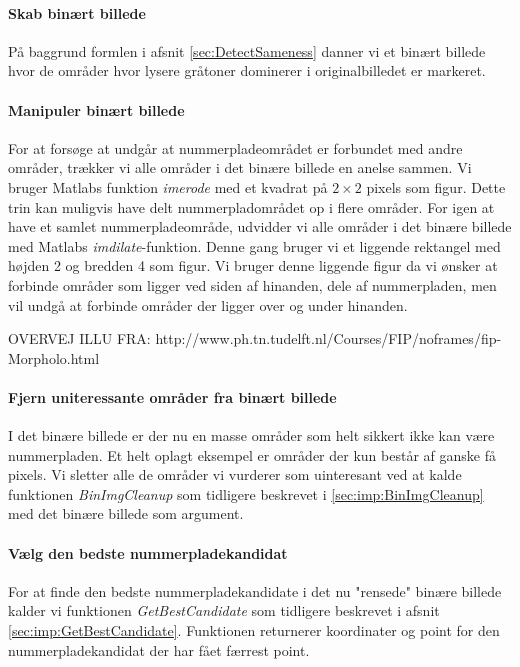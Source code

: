 \paragraph{Skab binært billede}
På baggrund formlen i afsnit \ref{sec:DetectSameness} danner vi et binært billede hvor de områder hvor lysere gråtoner dominerer i originalbilledet er markeret.

\paragraph{Manipuler binært billede}
For at forsøge at undgår at nummerpladeområdet er forbundet med andre områder, trækker vi alle områder i det binære billede en anelse sammen. Vi bruger Matlabs funktion \textit{imerode} med et kvadrat på $2 \times 2$ pixels som figur. Dette trin kan muligvis have delt nummerpladområdet op i flere områder. For igen at have et samlet nummerpladeområde, udvidder vi alle områder i det binære billede med Matlabs \textit{imdilate}-funktion. Denne gang bruger vi et liggende rektangel med højden 2 og bredden 4 som figur. Vi bruger denne liggende figur da vi ønsker at forbinde områder som ligger ved siden af hinanden, dele af nummerpladen, men vil undgå at forbinde områder der ligger over og under hinanden. 

OVERVEJ ILLU FRA: http://www.ph.tn.tudelft.nl/Courses/FIP/noframes/fip-Morpholo.html

\paragraph{Fjern uniteressante områder fra binært billede}
I det binære billede er der nu en masse områder som helt sikkert ikke kan være nummerpladen. Et helt oplagt eksempel er områder der kun består af ganske få pixels. Vi sletter alle de områder vi vurderer som uinteresant ved at kalde funktionen \textit{BinImgCleanup} som tidligere beskrevet i \vref{sec:imp:BinImgCleanup} med det binære billede som argument.


\paragraph{Vælg den bedste nummerpladekandidat}
For at finde den bedste nummerpladekandidate i det nu "rensede" binære billede kalder vi funktionen \textit{GetBestCandidate} som tidligere beskrevet i afsnit \vref{sec:imp:GetBestCandidate}. Funktionen returnerer koordinater og point for den nummerpladekandidat der har fået færrest point. 



